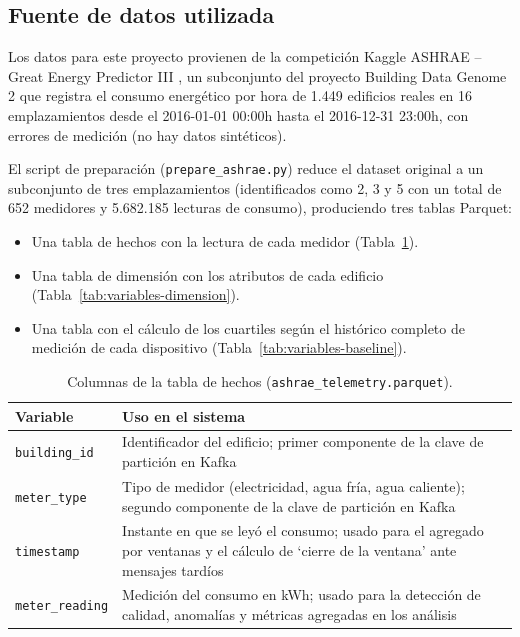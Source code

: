 \subsection{Fuente de datos utilizada}
\label{sec:fuente-datos}

Los datos para este proyecto provienen de la competición Kaggle ASHRAE -- Great Energy Predictor III \cite{ashrae2019}, un subconjunto del proyecto Building Data Genome 2 que registra el consumo energético por hora de 1.449 edificios reales en 16 emplazamientos desde el 2016-01-01 00:00h hasta el 2016-12-31 23:00h, con errores de medición (no hay datos sintéticos).

El script de preparación (\texttt{prepare\_ashrae.py}) reduce el dataset original a un subconjunto de tres emplazamientos (identificados como 2, 3 y 5 con un total de 652 medidores y 5.682.185 lecturas de consumo), produciendo tres tablas Parquet:

\begin{itemize}
  \item Una tabla de hechos con la lectura de cada medidor (Tabla~\ref{tab:variables-hechos}).
  \item Una tabla de dimensión con los atributos de cada edificio (Tabla~\ref{tab:variables-dimension}).
  \item Una tabla con el cálculo de los cuartiles según el histórico completo de medición de cada dispositivo (Tabla~\ref{tab:variables-baseline}).
\end{itemize}

\begin{table}[H]
  \centering
  \begin{tabular}{|l|p{9cm}|}
    \hline
    \textbf{Variable} & \textbf{Uso en el sistema} \\ \hline
    \texttt{building\_id} & Identificador del edificio; primer componente de la clave de partición en Kafka \\ \hline
    \texttt{meter\_type} & Tipo de medidor (electricidad, agua fría, agua caliente); segundo componente de la clave de partición en Kafka \\ \hline
    \texttt{timestamp} & Instante en que se leyó el consumo; usado para el agregado por ventanas y el cálculo de `cierre de la ventana' ante mensajes tardíos \\ \hline
    \texttt{meter\_reading} & Medición del consumo en kWh; usado para la detección de calidad, anomalías y métricas agregadas en los análisis \\ \hline
  \end{tabular}
  \caption{Columnas de la tabla de hechos (\texttt{ashrae\_telemetry.parquet}).}
  \label{tab:variables-hechos}
\end{table}


